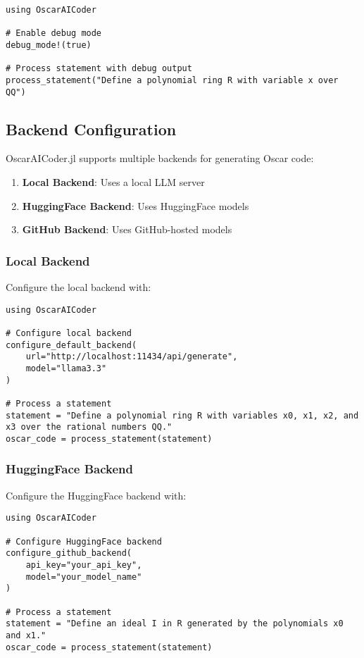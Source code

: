 \documentclass[11pt,a4paper]{article}
\begin{document}
\begin{lstlisting}
using OscarAICoder

# Enable debug mode
debug_mode!(true)

# Process statement with debug output
process_statement("Define a polynomial ring R with variable x over QQ")
\end{lstlisting}

\subsection{Backend Configuration}

OscarAICoder.jl supports multiple backends for generating Oscar code:

\begin{enumerate}
    \item \textbf{Local Backend}: Uses a local LLM server
    \item \textbf{HuggingFace Backend}: Uses HuggingFace models
    \item \textbf{GitHub Backend}: Uses GitHub-hosted models
\end{enumerate}

\subsubsection{Local Backend}

Configure the local backend with:

\begin{lstlisting}
using OscarAICoder

# Configure local backend
configure_default_backend(
    url="http://localhost:11434/api/generate",
    model="llama3.3"
)

# Process a statement
statement = "Define a polynomial ring R with variables x0, x1, x2, and x3 over the rational numbers QQ."
oscar_code = process_statement(statement)
\end{lstlisting}

\subsubsection{HuggingFace Backend}

Configure the HuggingFace backend with:

\begin{lstlisting}
using OscarAICoder

# Configure HuggingFace backend
configure_github_backend(
    api_key="your_api_key",
    model="your_model_name"
)

# Process a statement
statement = "Define an ideal I in R generated by the polynomials x0 and x1."
oscar_code = process_statement(statement)
\end{lstlisting}
\end{document}
